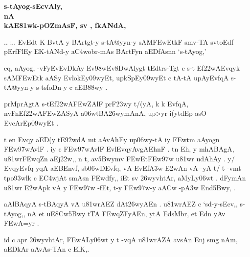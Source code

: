 \vfill

{\dn
\begin{center}
{\dn\Large\bfseries{s\2-tAyog{\rs -\re}sEcvAly,}}\\
{\dn\Large\bfseries{nA {\dn\dnnum {}}}}\\
{\dn\large\bfseries{kAE\381w\0k{\rs -\re}pOZ\0mAsF{\rs ,\re} s\2v {\dn\dnnum {}}{\rs ,\re} fkANdA, {\dn\dnnum {}}}}
\end{center}
}

\newpage


{\dn .. :.. EvEdt\2 K BvtA\2 y BArtgt-y s\2-tA@yyn-y sAM\3FEwEtkF{\qva} smv-TA\2 sv\0toEdf\2 pErfFlEy\2 \dn\dnnum {} EK-tANd-y a\3C4wobr{\rs -\re}mAs\? BArtFy\?n aEDfAsn\?n {\rs `\re}s\2-tAyog,{\rs '\re}}

{\dn eq, aAyog, -vFyEvEvDkAy\?{\qvb} Ev\398wEv\38DwAlygt\2 tEdtr\-s\2-Tgt\2 c s\2-t\- Ef\322wAEvqyk\2 sAM\3FEwEtk aASy\2 EvlokEy\309wyEt{\rs ,\re} upkSpEy\309wyEt c tA\2-tA upAyEvf\?qA s\2-tA@yyn-y s\2-ts\2foDn-y c aEB\388wy\? .}

{\dn prMprAgtA\2 s\2-tEf\322wA\3FEwZAlF{\qva} prF\323wy t/(yA, k\? k\? Evf\?qA, nvFnEf\322wA\-\3FEwZASyA a\306wtBA\0\326wymAnA, up>y\?r i(y\?tdEp asO EvcArEp\309wyEt .}

{\dn t en\2 Evqy aED(y tE\392wdA\2 mt aAvAhEy up\306wy-tA iy\2 \3FEwt\?m aAyog\?n \3FEw\397wAvlF . iy\2 c \3FEw\397wAvlF EvlEvqyAvgAEhnF . t\?n Eh{\rs ,\re} y\? mhABAgA, u\381wr\3FEw\?qZ\?n aEj\322w\?,{\rs ,\re} n t\4, av\35Bwym\?v \3FEwEt\3FEw\397w u\381wr udAhAy\0 . y/ EvqyEvf\?q\? y\?qA aEBEnv\?f, s\2b\306wDEvf\?q, vA EvEf\3A3w\2 \3E2wAn\2 vA -yA t/ t\? -vmt\2 tpo\393wlk\2 c E\3C4wjAt\2 smAs\?n \3FEwdf\0y\?,{\rs ,\re} iEt sv\?{\qvb} \326wyvhtA\0r,  aMyLy\0\306wt\? . dFymAn u\381wr\2 \3E2wApk\2 vA y\2 \3FEw\397w\2 -fEt{\rs ,\re} t-y \3FEw\397w-y a\3ACw -p\3A3w\2 End\?{\qvb}\35Bwy, . }

{\dn aAlBAqyA s\2-tBAqyA vA u\381wrAEZ dAt\326wyAEn . u\381wrAEZ c {\rs `\re}sd-y{\rs -\re}sEcv,{\rs ,\re} s\2-tAyog,{\rs ,\re} nA \dn\dnnum {} et uE\38Cw\35Bwy tTA \3FEw\?qZFyAEn{\rs ,\re} ytA  EdsMbr{\rs ,\re}  et Edn\2 yAv \3FEwA=y\?r .}

{\dn  id\2 c apr\2 \326wyvhtA\0r, \3FEwALy\0\306wt\?{\rs ,\re} y t\? -v\?qA u\381wrAZA avsAn\? Enj\2 smg\5\2 nAm{\rs ,\re} aEDkAr aAvAs-TAn\2 c ElK\?,\1.}

